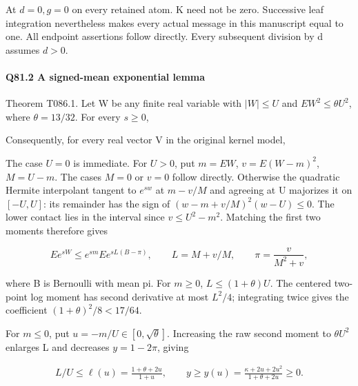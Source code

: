 At \(d=0,\allowbreak  g=0\) on every retained atom. K need not be zero. Successive
leaf integration nevertheless makes every actual message in this
manuscript equal to one. All endpoint assertions follow directly.
Every subsequent division by d assumes \(d>0.\)

\paragraph{Q81.2 A signed-mean exponential lemma}\label{part:Q81.2}

Theorem T086.1. Let W be any finite real variable with
\(|W|\le U\) and \(EW^2\le\theta U^2\), where \(\theta=13/32\).
For every \(s\ge0\),


Consequently, for every real vector V in the original kernel model,


The case \(U=0\) is immediate. For \(U>0\), put \(m=EW\),
\(v=E(W-m)^2\), \(M=U-m\). The cases \(M=0\) or \(v=0\) follow
directly. Otherwise the quadratic Hermite interpolant tangent to
\(e^{sw}\) at \(m-v/M\) and agreeing at U majorizes it on \([-U,U]\):
its remainder has the sign of \((w-m+v/M)^2(w-U)\le0\).
The lower contact lies in the interval since \(v\le U^2-m^2\).
Matching the first two moments therefore gives

\begin{equation}\tag{Q81.2.3}\label{eq:Q102:3.3}
Ee^{sW}\le e^{sm}Ee^{sL(B-\pi)},\qquad
L=M+v/M,\qquad \pi=\frac{v}{M^2+v},
\end{equation}

where B is Bernoulli with mean pi. For \(m\ge0\),
\(L\le(1+\theta)U\). The centered two-point log moment has second
derivative at most \(L^2/4\); integrating twice gives the coefficient
\((1+\theta)^2/8<17/64\).

For \(m\le0\), put \(u=-m/U\in[0,\sqrt\theta]\). Increasing the raw
second moment to \(\theta U^2\) enlarges L and decreases \(y=1-2\pi\),
giving

\begin{equation}\tag{Q81.2.4}\label{eq:Q102:3.4}
\begin{gathered}
L/U\le\ell(u)=\frac{1+\theta+2u}{1+u},\qquad
y\ge y(u)=\frac{\kappa+2u+2u^2}{1+\theta+2u}\ge0.
\end{gathered}
\end{equation}

